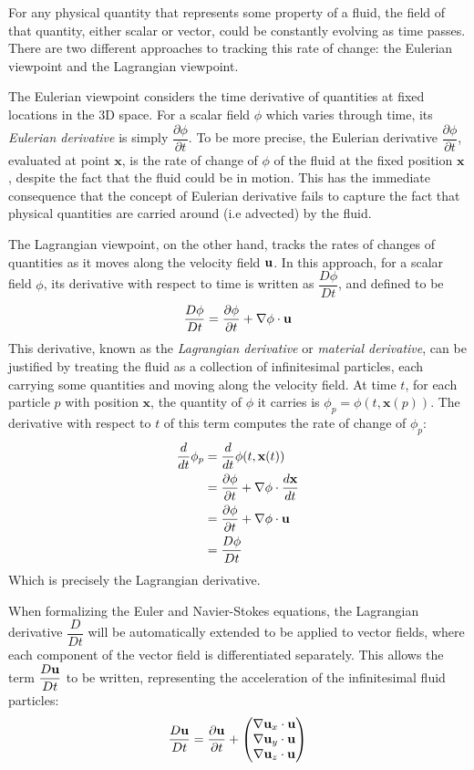 For any physical quantity that represents some property of a fluid, the field of that quantity, either scalar or vector, could be constantly evolving as time passes. There are two different approaches to tracking this rate of change: the Eulerian viewpoint and the Lagrangian viewpoint.

The Eulerian viewpoint considers the time derivative of quantities at fixed locations in the 3D space. For a scalar field $\phi$ which varies through time, its \textit{Eulerian derivative} is simply $\dfrac{\partial \phi}{\partial t}$. To be more precise, the Eulerian derivative $\dfrac{\partial \phi}{\partial t}$, evaluated at point $\textbf{x}$, is the rate of change of $\phi$ of the fluid at the fixed position $\textbf{x}$, despite the fact that the fluid could be in motion. This has the immediate consequence that the concept of Eulerian derivative fails to capture the fact that physical quantities are carried around (i.e advected) by the fluid. 

The Lagrangian viewpoint, on the other hand, tracks the rates of changes of quantities as it moves along the velocity field $\textbf{u}$. In this approach, for a scalar field $\phi$, its derivative with respect to time is written as $\dfrac{D\phi}{Dt}$, and defined to be
$$
\frac{D\phi}{Dt} = \frac{\partial\phi}{\partial t} + \nabla \phi \cdot \textbf{u}
$$ 
This derivative, known as the \textit{Lagrangian derivative} or \textit{material derivative}, can be justified by treating the fluid as a collection of infinitesimal particles, each carrying some quantities and moving along the velocity field. At time $t$, for each particle $p$ with position $\textbf{x}$, the quantity of $\phi$ it carries is $\phi_p = \phi(t,\textbf{x}(p))$. The derivative with respect to $t$ of this term computes the rate of change of $\phi _p$:
$$
\begin{aligned}
    \frac{d}{dt} \phi_p
        &= \frac{d}{dt} \phi(t,\textbf{x}(t)) \\
        &= \frac{\partial \phi}{\partial t} + \nabla \phi \cdot \frac{d\textbf{x}}{dt} \\ 
        &= \frac{\partial \phi}{\partial t} + \nabla \phi \cdot \textbf{u} \\
        &=\frac{D\phi}{Dt}
\end{aligned}
$$
Which is precisely the Lagrangian derivative.

When formalizing the Euler and Navier-Stokes equations, the Lagrangian derivative $\dfrac{D}{Dt}$ will be automatically extended to be applied to vector fields, where each component of the vector field is differentiated separately. This allows the term $\dfrac{D\textbf{u}}{Dt}$ to be written, representing the acceleration of the infinitesimal fluid particles:
\begin{equation}
    \label{Du/Dt}
    \frac{D\textbf{u}}{Dt} = \frac{\partial\textbf{u}}{\partial t}
    + \begin{pmatrix}
       \nabla \textbf{u}_x  \cdot \textbf{u}\\
        \nabla \textbf{u}_y \cdot \textbf{u}\\
        \nabla \textbf{u}_z \cdot \textbf{u}
     \end{pmatrix}
\end{equation}


